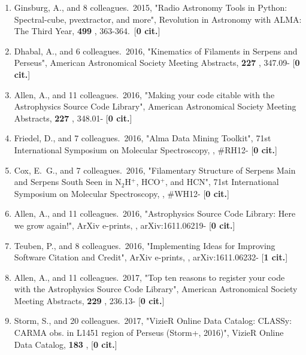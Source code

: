 \documentclass[11pt,letterpaper]{article}
\begin{document}
\begin{enumerate}[resume,label=\textbf{\arabic*}.]
\item  
Ginsburg, A., and 8 colleagues.\  2015,  "Radio Astronomy Tools in Python: 
Spectral-cube, pvextractor, and more", Revolution in Astronomy with ALMA: 
The Third Year,  {\bf 499} , 363-364.\  [{\bf 0 cit.}] 

\item  
Dhabal, A., and 6 colleagues.\  2016,  "Kinematics of Filaments in Serpens 
and Perseus", American Astronomical Society Meeting Abstracts,  {\bf 227} , 
347.09- [{\bf 0 cit.}] 

\item  
Allen, A., and 11 colleagues.\  2016,  "Making your code citable with the 
Astrophysics Source Code Library", American Astronomical Society Meeting 
Abstracts,  {\bf 227} , 348.01- [{\bf 0 cit.}] 

\item  
Friedel, D., and 7 colleagues.\  2016,  "Alma Data Mining Toolkit", 71st 
International Symposium on Molecular Spectroscopy,  , \#RH12- [{\bf 0 
cit.}] 

\item  
Cox, E.~G., and 7 colleagues.\  2016,  "Filamentary Structure of Serpens 
Main and Serpens South Seen in N$_{2}$H$^{+}$, HCO$^{+}$, and HCN", 71st 
International Symposium on Molecular Spectroscopy,  , \#WH12- [{\bf 0 
cit.}] 

\item  
Allen, A., and 11 colleagues.\  2016,  "Astrophysics Source Code Library: 
Here we grow again!", ArXiv e-prints,  , arXiv:1611.06219- [{\bf 0 cit.}] 

\item  
Teuben, P., and 8 colleagues.\  2016,  "Implementing Ideas for Improving 
Software Citation and Credit", ArXiv e-prints,  , arXiv:1611.06232- [{\bf 1 
cit.}] 

\item  
Allen, A., and 11 colleagues.\  2017,  "Top ten reasons to register your 
code with the Astrophysics Source Code Library", American Astronomical 
Society Meeting Abstracts,  {\bf 229} , 236.13- [{\bf 0 cit.}] 

\item  
Storm, S., and 20 colleagues.\  2017,  "VizieR Online Data Catalog: CLASSy: 
CARMA obs. in L1451 region of Perseus (Storm+, 2016)", VizieR Online Data 
Catalog,  {\bf 183} ,  [{\bf 0 cit.}] 


\end{enumerate}
\end{document}

